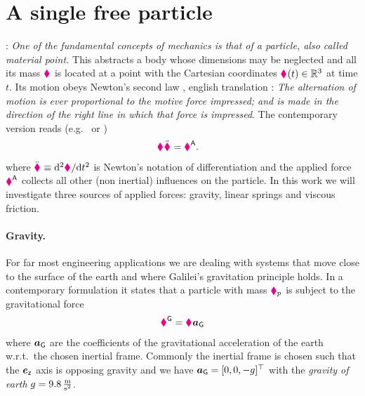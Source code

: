 \section{A single free particle}
\cite[§1]{Landau:Mechanics}: \textit{One of the fundamental concepts of mechanics is that of a \textit{particle}, also called material point.}
This abstracts a body whose dimensions may be neglected and all its mass $\textcolor{magenta}{\blacklozenge}_{}$ is located at a point with the Cartesian coordinates $\boldsymbol{\textcolor{magenta}{\blacklozenge}}_{}(t)\in\mathbb{R}^3$ at time $t$.
Its motion obeys Newton's second law \cite[p.\ 13, lex II]{Newton:Principia}, english translation \cite[p.\ 83]{Newton:PrincipiaEnglish}: \textit{The alternation of motion is ever proportional to the motive force impressed; and is made in the direction of the right line in which that force is impressed}. 
The contemporary version reads (e.g.\ \cite[eq.\ 6.1.1]{Lurie:AnalyticalMechanics} or \cite[eq.\ 1.3]{Goldstein:ClassicalMechanics})
\begin{align}\label{eq:NewtonsSecondLaw}
 \textcolor{magenta}{\blacklozenge}_{} \ddot{\boldsymbol{\textcolor{magenta}{\blacklozenge}}}_{} &= \boldsymbol{\textcolor{magenta}{\blacklozenge}}_{}^{\mathsf{A}}.
\end{align}
where $\ddot{\boldsymbol{\textcolor{magenta}{\blacklozenge}}}_{} \equiv \mathrm{d}^2 \boldsymbol{\textcolor{magenta}{\blacklozenge}}_{} / \mathrm{d} t^2$ is Newton's notation of differentiation and the applied force $\boldsymbol{\textcolor{magenta}{\blacklozenge}}_{}^{\mathsf{A}}$ collects all other (non inertial) influences on the particle.
In this work we will investigate three sources of applied forces: gravity, linear springs and viscous friction.

\paragraph{Gravity.}
For far most engineering applications we are dealing with systems that move close to the surface of the earth and where Galilei's gravitation principle \cite[Day 3]{Galileo:TwoNewSciences} holds.
In a contemporary formulation it states that a particle with mass $\textcolor{magenta}{\blacklozenge}_{p}$ is subject to the gravitational force
\begin{align}\label{eq:ParticleGravity}
 \boldsymbol{\textcolor{magenta}{\blacklozenge}}_{}^{\mathsf{G}} = \textcolor{magenta}{\blacklozenge}_{} \boldsymbol{a}_{\mathsf{G}}
\end{align}
where $\boldsymbol{a}_{\mathsf{G}}$ are the coefficients of the gravitational acceleration of the earth w.r.t.\ the chosen inertial frame.
Commonly the inertial frame is chosen such that the $\boldsymbol{e}_{\mathsf{z}}$ axis is opposing gravity and we have $\boldsymbol{a}_{\mathsf{G}} = [0,0,-g]^\top$ with the \textit{gravity of earth} $g = 9.8\,\tfrac{\text{m}}{\text{s}^2}$.

